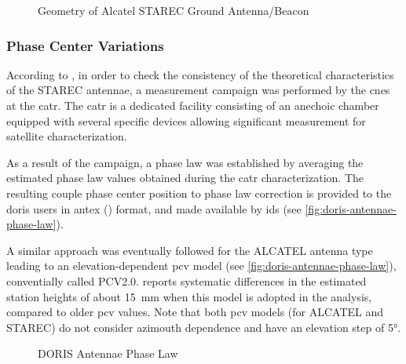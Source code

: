\begin{figure}
  \centering
  
  \caption{Geometry of Alcatel STAREC Ground Antenna/Beacon}
  \label{fig:starec-antenna}
\end{figure}

\subsubsection{Phase Center Variations}\label{sssec:doris-pcv}
According to \cite{Tourain2016}, in order to check the consistency of the theoretical 
characteristics of the STAREC antennae, a measurement campaign was performed by 
the \gls{cnes} at the \gls{catr}. The \gls{catr} is a dedicated facility 
consisting of an anechoic chamber equipped with several specific devices 
allowing significant measurement for satellite characterization.

As a result of the campaign, a phase law was established by averaging the 
estimated phase law values obtained during the \gls{catr} characterization. 
The resulting couple phase center position to phase law correction is provided 
to the \gls{doris} users in \gls{antex} (\cite{ANTEXv14}) format, and 
made available by \gls{ids} (see \autoref{fig:doris-antennae-phase-law}).

A similar approach was eventually followed for the ALCATEL antenna type 
leading to an elevation-dependent \gls{pcv} model (see \autoref{fig:doris-antennae-phase-law}), 
conventially called PCV2.0. \cite{Stepanek2022} reports systematic differences in 
the estimated station heights of about \SI{15}{\milli\meter} when this model is 
adopted in the analysis, compared to older \gls{pcv} values. Note that both 
\gls{pcv} models (for ALCATEL and STAREC) do not consider azimouth dependence 
and have an elevation step of \ang{5}.

\begin{figure}
  \centering
  
  \caption{DORIS Antennae Phase Law}
  \label{fig:doris-antennae-phase-law}
\end{figure}
